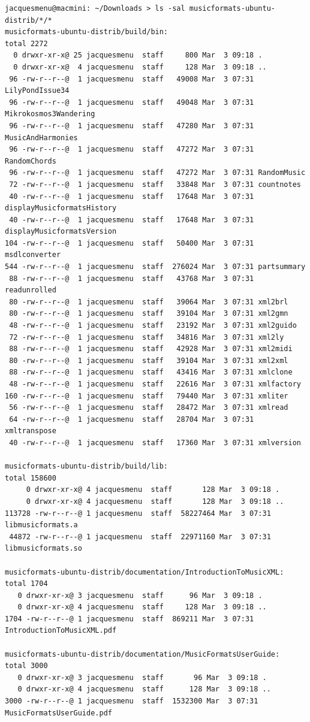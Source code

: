 \begin{lstlisting}[language=Terminal]
jacquesmenu@macmini: ~/Downloads > ls -sal musicformats-ubuntu-distrib/*/*
musicformats-ubuntu-distrib/build/bin:
total 2272
  0 drwxr-xr-x@ 25 jacquesmenu  staff     800 Mar  3 09:18 .
  0 drwxr-xr-x@  4 jacquesmenu  staff     128 Mar  3 09:18 ..
 96 -rw-r--r--@  1 jacquesmenu  staff   49008 Mar  3 07:31 LilyPondIssue34
 96 -rw-r--r--@  1 jacquesmenu  staff   49048 Mar  3 07:31 Mikrokosmos3Wandering
 96 -rw-r--r--@  1 jacquesmenu  staff   47280 Mar  3 07:31 MusicAndHarmonies
 96 -rw-r--r--@  1 jacquesmenu  staff   47272 Mar  3 07:31 RandomChords
 96 -rw-r--r--@  1 jacquesmenu  staff   47272 Mar  3 07:31 RandomMusic
 72 -rw-r--r--@  1 jacquesmenu  staff   33848 Mar  3 07:31 countnotes
 40 -rw-r--r--@  1 jacquesmenu  staff   17648 Mar  3 07:31 displayMusicformatsHistory
 40 -rw-r--r--@  1 jacquesmenu  staff   17648 Mar  3 07:31 displayMusicformatsVersion
104 -rw-r--r--@  1 jacquesmenu  staff   50400 Mar  3 07:31 msdlconverter
544 -rw-r--r--@  1 jacquesmenu  staff  276024 Mar  3 07:31 partsummary
 88 -rw-r--r--@  1 jacquesmenu  staff   43768 Mar  3 07:31 readunrolled
 80 -rw-r--r--@  1 jacquesmenu  staff   39064 Mar  3 07:31 xml2brl
 80 -rw-r--r--@  1 jacquesmenu  staff   39104 Mar  3 07:31 xml2gmn
 48 -rw-r--r--@  1 jacquesmenu  staff   23192 Mar  3 07:31 xml2guido
 72 -rw-r--r--@  1 jacquesmenu  staff   34816 Mar  3 07:31 xml2ly
 88 -rw-r--r--@  1 jacquesmenu  staff   42928 Mar  3 07:31 xml2midi
 80 -rw-r--r--@  1 jacquesmenu  staff   39104 Mar  3 07:31 xml2xml
 88 -rw-r--r--@  1 jacquesmenu  staff   43416 Mar  3 07:31 xmlclone
 48 -rw-r--r--@  1 jacquesmenu  staff   22616 Mar  3 07:31 xmlfactory
160 -rw-r--r--@  1 jacquesmenu  staff   79440 Mar  3 07:31 xmliter
 56 -rw-r--r--@  1 jacquesmenu  staff   28472 Mar  3 07:31 xmlread
 64 -rw-r--r--@  1 jacquesmenu  staff   28704 Mar  3 07:31 xmltranspose
 40 -rw-r--r--@  1 jacquesmenu  staff   17360 Mar  3 07:31 xmlversion

musicformats-ubuntu-distrib/build/lib:
total 158600
     0 drwxr-xr-x@ 4 jacquesmenu  staff       128 Mar  3 09:18 .
     0 drwxr-xr-x@ 4 jacquesmenu  staff       128 Mar  3 09:18 ..
113728 -rw-r--r--@ 1 jacquesmenu  staff  58227464 Mar  3 07:31 libmusicformats.a
 44872 -rw-r--r--@ 1 jacquesmenu  staff  22971160 Mar  3 07:31 libmusicformats.so

musicformats-ubuntu-distrib/documentation/IntroductionToMusicXML:
total 1704
   0 drwxr-xr-x@ 3 jacquesmenu  staff      96 Mar  3 09:18 .
   0 drwxr-xr-x@ 4 jacquesmenu  staff     128 Mar  3 09:18 ..
1704 -rw-r--r--@ 1 jacquesmenu  staff  869211 Mar  3 07:31 IntroductionToMusicXML.pdf

musicformats-ubuntu-distrib/documentation/MusicFormatsUserGuide:
total 3000
   0 drwxr-xr-x@ 3 jacquesmenu  staff       96 Mar  3 09:18 .
   0 drwxr-xr-x@ 4 jacquesmenu  staff      128 Mar  3 09:18 ..
3000 -rw-r--r--@ 1 jacquesmenu  staff  1532300 Mar  3 07:31 MusicFormatsUserGuide.pdf
\end{lstlisting}

